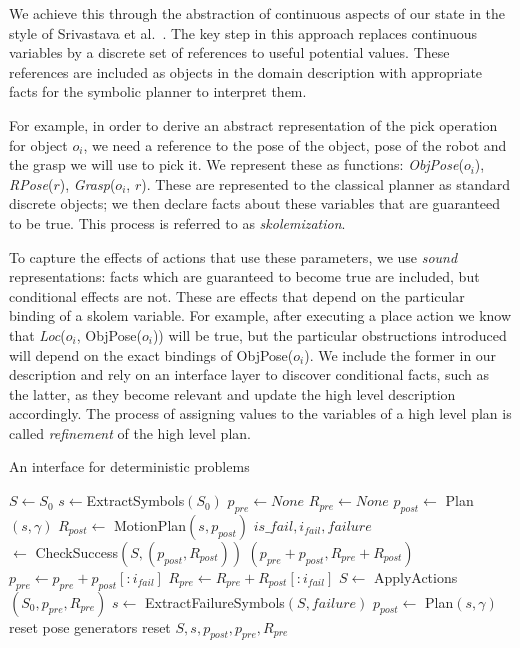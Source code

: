 We achieve this through the abstraction of continuous aspects of our
state in the style of Srivastava et
al.~\cite{srivastava2014combined}. The key step in this approach
replaces continuous variables by a discrete set of references to useful
potential values. These references are included as objects in
the domain description with appropriate facts for the symbolic planner
to interpret them.

For example, in order to derive an abstract representation of the pick
operation for object $o_i$, we need a reference to the pose of the
object, pose of the robot and the grasp we will use to pick it. We represent these as
functions: \emph{ObjPose}($o_i$), \emph{RPose}($r$), \emph{Grasp}($o_i$, $r$). These are represented to the
classical planner as standard discrete objects; we then declare facts
about these variables that are guaranteed to be true. This process is
referred to as \emph{skolemization}.

To capture the effects of actions that use these parameters, we use
\emph{sound} representations: facts which are guaranteed to become
true are included, but conditional effects are not. These are effects
that depend on the particular binding of a skolem variable. For
example, after executing a place action we know that \emph{Loc}($o_i$,
ObjPose($o_i$)) will be true, but the particular obstructions introduced
will depend on the exact bindings of ObjPose($o_i$). We include the
former in our description and rely on an interface layer to discover
conditional facts, such as the latter, as they become relevant and update the high level
description accordingly. The process of assigning values to the variables
of a high level plan is called \emph{refinement} of the high level
plan.

\begin{algorithm}
 \caption{An interface for deterministic problems} \label{alg-ifop}
 \begin{algorithmic}[1]
  \State $S \leftarrow S_0$
  \State $s \leftarrow $ExtractSymbols$(S_0)$
  \State $p_{pre} \leftarrow None$
  \State $R_{pre} \leftarrow None$
  \State $p_{post} \leftarrow $ Plan$(s, \gamma)$
     \State $R_{post} \leftarrow $ MotionPlan$(s, p_{post})$
     \State $is\_fail, i_{fail}, failure$\\\hspace{50pt}$ \leftarrow $ CheckSuccess$(S, (p_{post}, R_{post}))$
         \State \Return $(p_{pre} + p_{post}, R_{pre} + R_{post})$
     \EndIf
     \State $p_{pre} \leftarrow p_{pre} + p_{post}[:i_{fail}]$
     \State $R_{pre} \leftarrow R_{pre} + R_{post}[:i_{fail}]$
     \State $S \leftarrow $ ApplyActions$(S_0, p_{pre}, R_{pre})$
     \State $s\leftarrow $ ExtractFailureSymbols$(S, failure)$
     \State $p_{post} \leftarrow $ Plan$(s, \gamma)$     
        \State reset pose generators
        \State reset $S, s, p_{post}, p_{pre}, R_{pre}$
     \EndIf
  \EndWhile
  \EndProcedure
 \end{algorithmic}
\end{algorithm}


